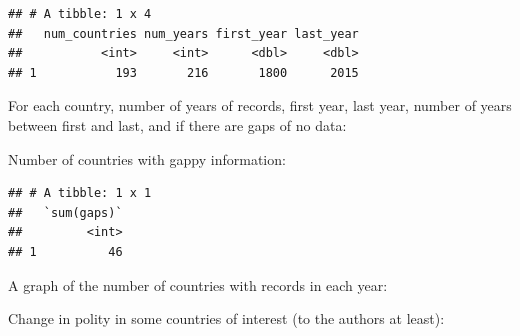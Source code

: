 \documentclass[]{book}
\newenvironment{Shaded}{\begin{snugshade}}{\end{snugshade}}
\newcommand{\DataTypeTok}[1]{\textcolor[rgb]{0.13,0.29,0.53}{#1}}
\newcommand{\DecValTok}[1]{\textcolor[rgb]{0.00,0.00,0.81}{#1}}
\newcommand{\KeywordTok}[1]{\textcolor[rgb]{0.13,0.29,0.53}{\textbf{#1}}}
\newcommand{\NormalTok}[1]{#1}
\newcommand{\OperatorTok}[1]{\textcolor[rgb]{0.81,0.36,0.00}{\textbf{#1}}}
\newcommand{\StringTok}[1]{\textcolor[rgb]{0.31,0.60,0.02}{#1}}
\begin{document}
\begin{verbatim}
## # A tibble: 1 x 4
##   num_countries num_years first_year last_year
##           <int>     <int>      <dbl>     <dbl>
## 1           193       216       1800      2015
\end{verbatim}

For each country, number of years of records, first year, last year, number of years between first and last, and if there are gaps of no data:

\begin{Shaded}
\end{Shaded}

Number of countries with gappy information:

\begin{Shaded}
\end{Shaded}

\begin{verbatim}
## # A tibble: 1 x 1
##   `sum(gaps)`
##         <int>
## 1          46
\end{verbatim}

A graph of the number of countries with records in each year:

Change in polity in some countries of interest (to the authors at least):
\end{document}
